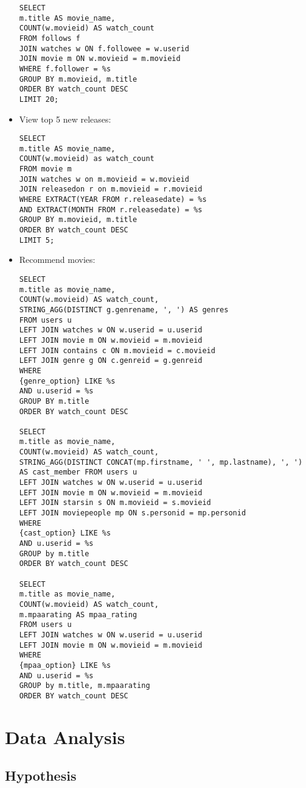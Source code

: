 \documentclass[12pt]{article}
\begin{document}
\begin{itemize}
\begin{verbatim}
SELECT
m.title AS movie_name,
COUNT(w.movieid) AS watch_count
FROM follows f
JOIN watches w ON f.followee = w.userid
JOIN movie m ON w.movieid = m.movieid
WHERE f.follower = %s
GROUP BY m.movieid, m.title
ORDER BY watch_count DESC
LIMIT 20;
\end{verbatim}
    \item View top 5 new releases: \begin{verbatim}
SELECT
m.title AS movie_name,
COUNT(w.movieid) as watch_count
FROM movie m
JOIN watches w on m.movieid = w.movieid
JOIN releasedon r on m.movieid = r.movieid
WHERE EXTRACT(YEAR FROM r.releasedate) = %s
AND EXTRACT(MONTH FROM r.releasedate) = %s
GROUP BY m.movieid, m.title
ORDER BY watch_count DESC
LIMIT 5;
\end{verbatim}
    \item Recommend movies: \begin{verbatim}
SELECT
m.title as movie_name,
COUNT(w.movieid) AS watch_count,
STRING_AGG(DISTINCT g.genrename, ', ') AS genres
FROM users u
LEFT JOIN watches w ON w.userid = u.userid
LEFT JOIN movie m ON w.movieid = m.movieid
LEFT JOIN contains c ON m.movieid = c.movieid
LEFT JOIN genre g ON c.genreid = g.genreid
WHERE 
{genre_option} LIKE %s
AND u.userid = %s
GROUP BY m.title
ORDER BY watch_count DESC

SELECT
m.title as movie_name,
COUNT(w.movieid) AS watch_count,
STRING_AGG(DISTINCT CONCAT(mp.firstname, ' ', mp.lastname), ', ') 
AS cast_member FROM users u
LEFT JOIN watches w ON w.userid = u.userid
LEFT JOIN movie m ON w.movieid = m.movieid
LEFT JOIN starsin s ON m.movieid = s.movieid
LEFT JOIN moviepeople mp ON s.personid = mp.personid 
WHERE 
{cast_option} LIKE %s
AND u.userid = %s
GROUP by m.title 
ORDER BY watch_count DESC

SELECT
m.title as movie_name,
COUNT(w.movieid) AS watch_count,
m.mpaarating AS mpaa_rating
FROM users u
LEFT JOIN watches w ON w.userid = u.userid
LEFT JOIN movie m ON w.movieid = m.movieid
WHERE 
{mpaa_option} LIKE %s
AND u.userid = %s
GROUP by m.title, m.mpaarating
ORDER BY watch_count DESC
\end{verbatim}
\end{itemize}

\section{Data Analysis}
\subsection{Hypothesis}
\end{document}
